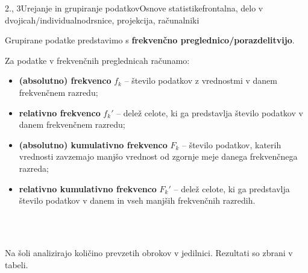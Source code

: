 \begin{priprava}{2., 3}{}{Urejanje in grupiranje podatkov}{Osnove statistike}{frontalna, delo v dvojicah/individualno}{drsnice, projekcija, računalniki}
        
            
                Grupirane podatke predstavimo s \textbf{frekvenčno preglednico/porazdelitvijo}.
            

            
                Za podatke v frekvenčnih preglednicah računamo:
                \begin{itemize}
                    \item \textbf{(absolutno) frekvenco} $f_k$ -- število podatkov z vrednostmi v danem frekvenčnem razredu;
                    \item \textbf{relativno frekvenco} $f_k'$ -- delež celote, ki ga predstavlja število podatkov v danem frekvenčnem razredu;
                    \item \textbf{(absolutno) kumulativno frekvenco} $F_k$ -- število podatkov, katerih vrednosti zavzemajo manjšo vrednost od zgornje meje danega frekvenčnega razreda;
                    \item \textbf{relativno kumulativno frekvenco} $F_k'$ -- delež celote, ki ga predstavlja število podatkov v danem in vseh manjših frekvenčnih razredih.
                \end{itemize}
            
        
                ~\\~


        
        
                    \begin{naloga}
                        Na šoli analizirajo količino prevzetih obrokov v jedilnici. Rezultati so zbrani v tabeli. 
        

\end{naloga}
\end{priprava}

